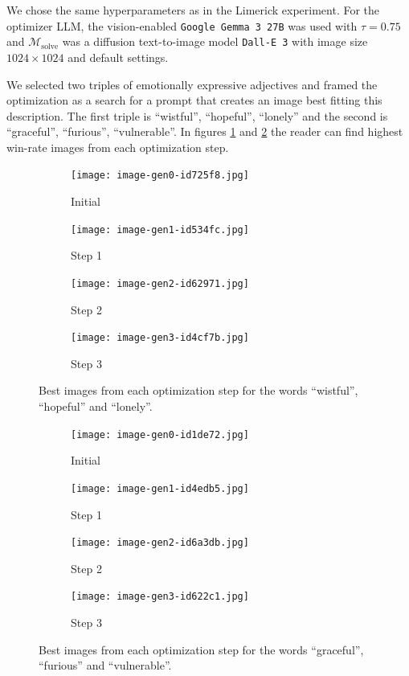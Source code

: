 We chose the same hyperparameters as in the Limerick experiment. For the optimizer LLM, the vision-enabled \texttt{Google Gemma 3 27B} was used with $\tau = 0.75$ and 
$\mathscr{M}_{\text{solve}}$ was a diffusion text-to-image model \texttt{Dall-E 3} with image size $1024\times1024$ and default settings.

We selected two triples of emotionally expressive adjectives and framed the optimization as a search for a prompt that creates an image best fitting this description. 
The first triple is ``wistful'', ``hopeful'', ``lonely'' and the second is ``graceful'', ``furious'', ``vulnerable''. In figures \ref{fig:wistful} and \ref{fig:graceful} the reader can find
highest win-rate images from each optimization step.


\begin{figure}[htbp]
    \centering

    \begin{subfigure}{0.24\linewidth}
        \texttt{[image: image-gen0-id725f8.jpg]}
        \caption{Initial}
    \end{subfigure}
    \hfill
    \begin{subfigure}{0.24\linewidth}
        \texttt{[image: image-gen1-id534fc.jpg]}
        \caption{Step 1}
    \end{subfigure}
    \hfill
    \begin{subfigure}{0.24\linewidth}
        \texttt{[image: image-gen2-id62971.jpg]}
        \caption{Step 2}
    \end{subfigure}
    \hfill
    \begin{subfigure}{0.24\linewidth}
        \texttt{[image: image-gen3-id4cf7b.jpg]}
        \caption{Step 3}
    \end{subfigure}

    \caption{Best images from each optimization step for the words ``wistful'', ``hopeful'' and ``lonely''.}
    \label{fig:wistful}
\end{figure}

\begin{figure}[htbp]
    \centering

    \begin{subfigure}{0.24\linewidth}
        \texttt{[image: image-gen0-id1de72.jpg]}
        \caption{Initial}
    \end{subfigure}
    \hfill
    \begin{subfigure}{0.24\linewidth}
        \texttt{[image: image-gen1-id4edb5.jpg]}
        \caption{Step 1}
    \end{subfigure}
    \hfill
    \begin{subfigure}{0.24\linewidth}
        \texttt{[image: image-gen2-id6a3db.jpg]}
        \caption{Step 2}
    \end{subfigure}
    \hfill
    \begin{subfigure}{0.24\linewidth}
        \texttt{[image: image-gen3-id622c1.jpg]}
        \caption{Step 3}
    \end{subfigure}

    \caption{Best images from each optimization step for the words ``graceful'', ``furious'' and ``vulnerable''.}
    \label{fig:graceful}
\end{figure}

